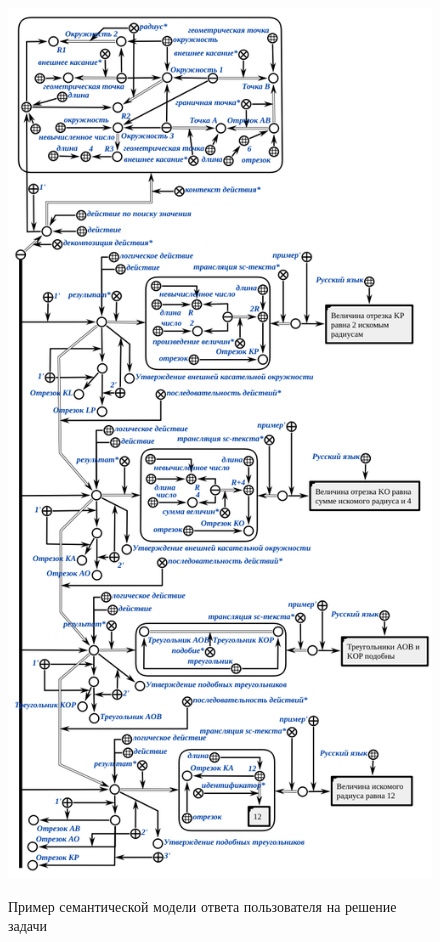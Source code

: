 \begin{figure}[H]
	\caption{Пример семантической модели ответа пользователя на решение задачи}
	\includegraphics[scale=0.7]{author/part7/figures/solving_task_example.png}
	\label{fig:STE_example}
\end{figure}

